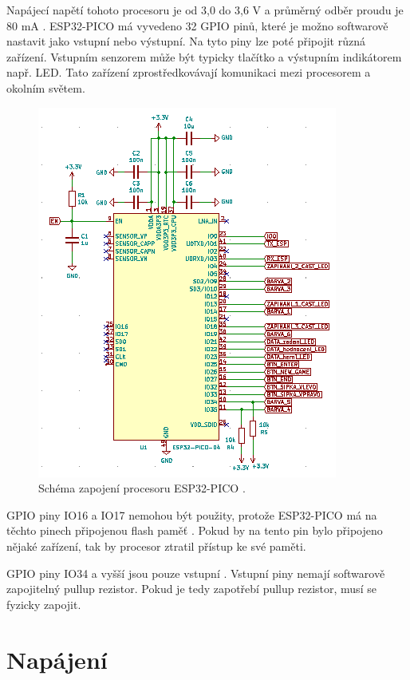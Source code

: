   Napájecí napětí tohoto procesoru je od 3,0 do 3,6 V a průměrný odběr proudu je 80 mA \cite{PICO_datasheet}. ESP32-PICO má vyvedeno 32 GPIO pinů, které je 
  možno softwarově nastavit jako vstupní nebo výstupní. Na tyto piny lze poté připojit různá zařízení. Vstupním senzorem může 
  být typicky tlačítko a výstupním indikátorem např. LED. Tato zařízení zprostředkovávají komunikaci mezi procesorem a okolním 
  světem.

  \begin{figure}[!h]
    \begin{center}
      \includegraphics[scale=1]{obrazky/ESP32_PICO_schema.png}
    \end{center}
    \caption[Schéma zapojení procesoru ESP32-PICO]{Schéma zapojení procesoru ESP32-PICO \cite{PICO_datasheet}.}
  \end{figure}

  GPIO piny IO16 a IO17 nemohou být použity, protože ESP32-PICO má na těchto pinech připojenou flash paměť \cite{PICO_datasheet}.
  Pokud by na tento pin bylo připojeno nějaké zařízení, tak by procesor ztratil přístup ke své paměti.

  GPIO piny IO34 a vyšší jsou pouze vstupní \cite{PICO_datasheet}. Vstupní piny nemají softwarově zapojitelný pullup rezistor. 
  Pokud je tedy zapotřebí pullup rezistor, musí se fyzicky zapojit.
  
  \section{Napájení}
